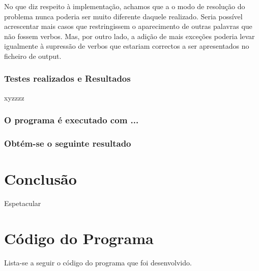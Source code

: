 \documentclass{report}
\begin{document}
No que diz respeito à implementação, achamos que a o modo de resolução do problema nunca poderia ser muito diferente daquele realizado. Seria possível acrescentar mais casos que restringissem o aparecimento de outras palavras que não fossem verbos. Mas, por outro lado, a adição de mais exceções poderia levar igualmente à supressão de verbos que estariam correctos a ser apresentados no ficheiro de output.

\subsection{Testes realizados e Resultados}
xyzzzz

\subsection{O programa é executado com ...}


\subsection{Obtém-se o seguinte resultado}

\chapter{Conclusão} \label{concl}
Espetacular


\appendix 
\chapter{Código do Programa}

Lista-se a seguir o código  do programa  que foi desenvolvido.




\end{document}
